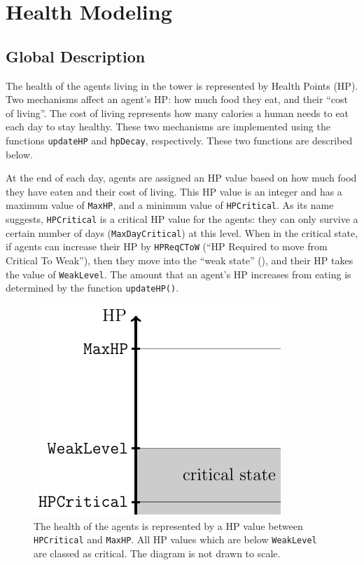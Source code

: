 \section{Health Modeling}\label{health_modeling}


%
%
\subsection{Global Description}

The health of the agents living in the tower is represented by Health Points (HP). Two mechanisms affect an agent's HP: how much food they eat, and their ``cost of living''. The cost of living represents how many calories a human needs to eat each day to stay healthy. These two mechanisms are implemented using the functions \lstinline$updateHP$ and \lstinline$hpDecay$, respectively. These two functions are described below.

At the end of each day, agents are assigned an HP value based on how much food they have eaten and their cost of living. This HP value is an integer and has a maximum value of \lstinline$MaxHP$, and a minimum value of \lstinline$HPCritical$. As its name suggests, \lstinline$HPCritical$ is a critical HP value for the agents: they can only survive a certain number of days (\lstinline$MaxDayCritical$) at this level. When in the critical state, if agents can increase their HP by \lstinline$HPReqCToW$ (``HP Required to move from Critical To Weak''), then they move into the ``weak state'' (), and their HP takes the value of \lstinline$WeakLevel$. The amount that an agent's HP increases from eating is determined by the function \lstinline$updateHP()$.

\begin{figure}[htb]
    \centering
    \includegraphics[width=0.3\linewidth]{002_simulation_structure/images/health_global.pdf}
    \caption{The health of the agents is represented by a HP value between \lstinline$HPCritical$ and \lstinline$MaxHP$. All HP values which are below \lstinline$WeakLevel$ are classed as critical. The diagram is not drawn to scale.}
    \label{fig:health_system}
\end{figure}

